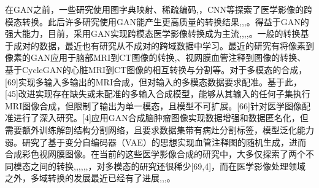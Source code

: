 \documentclass[letterpaper]{article} %
\begin{document}
在GAN之前，一些研究使用图字典映射\cite{22burgos2015robust}、稀疏编码\cite{33huang2017simultaneous},\cite{34vemulapalli2015unsupervised}，CNN\cite{36vannguyen2015crossdomain}等探索了医学影像的跨模态转换。此后许多研究使用GAN能产生更高质量的转换结果\cite{1zhao2018modular},\cite{5liang2018generative},\cite{6zhu2017unpaired},\cite{13choi2018stargan:}。得益于GAN的强大能力，目前，采用GAN实现跨模态医学影像转换成为主流\cite{2zhang2018translating},\cite{20nie2017medical},\cite{35osokin2017gans},\cite{36vannguyen2015crossdomain},\cite{40kamnitsas2017unsupervised}。一般的转换基于成对的数据，最近也有研究从不成对的跨域数据中学习\cite{2zhang2018translating}。最近的研究有将像素到像素的GAN应用于脑部MRI到CT图像的转换\cite{20nie2017medical},\cite{40kamnitsas2017unsupervised}、视网膜血管注释到图像的转换\cite{41costa2017towards}、基于CycleGAN\cite{6zhu2017unpaired}的心脏MRI到CT图像的相互转换与分割\cite{20nie2017medical}等。对于多模态的合成，[69]实现多输入多输出的MRI合成，但对输入的多模态数据要求配准。基于此，[45]改进实现存在缺失或未配准的多输入合成模型，能够从其输入的任何子集执行MRI图像合成，但限制了输出为单一模态，且模型不可扩展。[66]针对医学图像配准进行了深入研究。[4]应用GAN合成脑肿瘤图像实现数据增强和数据匿名化，但需要额外训练解剖结构分割网络，且要求数据集带有病灶分割标签，模型泛化能力弱。\cite{41costa2017towards}研究了基于变分自编码器（VAE）的思想实现血管注释图的随机生成，进而合成彩色视网膜图像。在当前的这些医学影像合成的研究中，大多仅探索了两个不同模态之间的转换\cite{2zhang2018translating},\cite{20nie2017medical},\cite{22burgos2015robust},\cite{34vemulapalli2015unsupervised},\cite{35osokin2017gans},\cite{36vannguyen2015crossdomain},\cite{40kamnitsas2017unsupervised}，对多模态的研究还很稀少[69,4]，而在医学影像处理领域之外，多域转换的发展最近已经有了进展\cite{1zhao2018modular},\cite{5liang2018generative},\cite{13choi2018stargan:},\cite{27isola2017image-to-image}。
\end{document}
